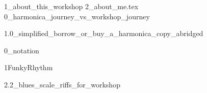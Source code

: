 {1_about_this_workshop}
{2_about_me.tex}
{0_harmonica_journey_vs_workshop_journey}

\newpage
{1.0_simplified_borrow_or_buy_a_harmonica_copy_abridged}

\newpage
{0_notation}

\newpage
{1FunkyRhythm}

\newpage
{2.2_blues_scale_riffs_for_workshop}





